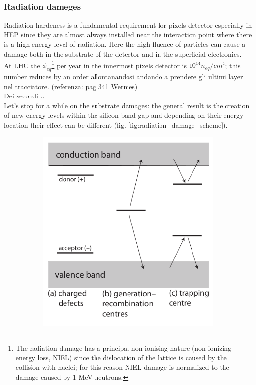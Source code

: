 \begin{titlepage}
\subsubsection{Radiation dameges}
Radiation hardeness is a fundamental requirement for pixels detector especially in HEP since they are almost always installed near the interaction point where there is a high energy level of radiation.
Here the high fluence of particles can cause a damage both in the substrate of the detector and in the superficial electronics.\\
At LHC the $\phi_{eq}$\footnote{The radiation damage has a principal non ionising nature (non ionizing energy loss, NIEL) since the dislocation of the lattice is caused by the collision with nuclei; for this reason NIEL damage is normalized to the damage caused by 1 MeV neutrons.} per year in the innermost pixels detector is $10^{14} n_{eq}/cm^2$; this number reduces by an order allontanandosi andando a prendere gli ultimi layer nel tracciatore. (referenza: pag 341 Wermes)\\
Dei secondi ..\\
Let's stop for a while on the substrate damages: the general result is the creation of new energy levels within the silicon band gap and depending on their energy-location their effect can be different (fig. \ref{fig:radiation_damage_scheme}). 
\begin{figure}
   \begin{subfigure}{.5\textwidth}
     \centering
     \includegraphics[width=.8\linewidth]{figures/radiation_damage_scheme.png}

\end{subfigure}
\end{figure}
\end{titlepage}
